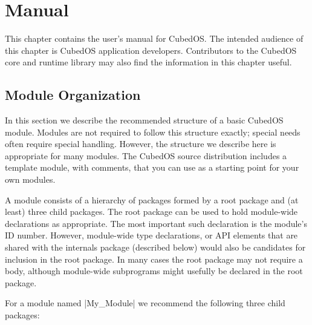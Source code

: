
\chapter{Manual}
\label{chapt:manual}

This chapter contains the user's manual for CubedOS. The intended audience of this chapter is
CubedOS application developers. Contributors to the CubedOS core and runtime library may also
find the information in this chapter useful.

\section{Module Organization}
\label{sec:module-organization}

In this section we describe the recommended structure of a basic CubedOS module. Modules are not
required to follow this structure exactly; special needs often require special handling.
However, the structure we describe here is appropriate for many modules. The CubedOS source
distribution includes a template module, with comments, that you can use as a starting point for
your own modules.

A module consists of a hierarchy of packages formed by a root package and (at least) three child
packages. The root package can be used to hold module-wide declarations as appropriate. The most
important such declaration is the module's ID number. However, module-wide type declarations, or
API elements that are shared with the internals package (described below) would also be
candidates for inclusion in the root package. In many cases the root package may not require a
body, although module-wide subprograms might usefully be declared in the root package.

For a module named |My_Module| we recommend the following three child packages:

